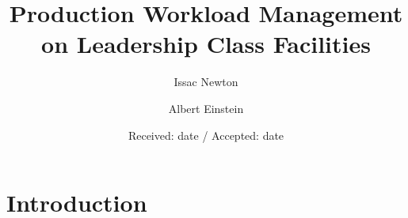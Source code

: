\documentclass[smallextended]{svjour3}      %
\begin{document}
\title{Production Workload Management on Leadership Class Facilities}



\author{Issac Newton \and Albert Einstein  %
}



\date{Received: date / Accepted: date}

\maketitle


\begin{abstract}
\end{abstract}



\section{Introduction}
\label{sec:intro}

\end{document}
